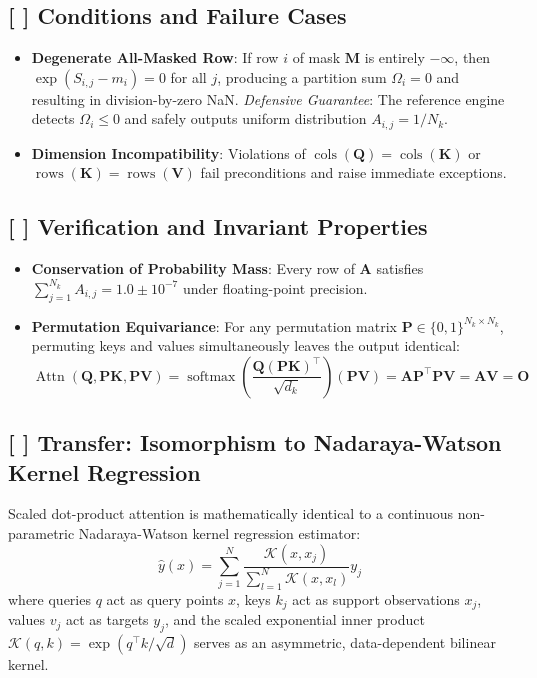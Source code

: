 \documentclass[11pt,a4paper]{article}
\theoremstyle{definition}
\begin{document}
\subsection{[ ] Conditions and Failure Cases}
\begin{itemize}
    \item \textbf{Degenerate All-Masked Row}: If row $i$ of mask $\mathbf{M}$ is entirely $-\infty$, then $\exp(S_{i, j} - m_i) = 0$ for all $j$, producing a partition sum $\Omega_i = 0$ and resulting in division-by-zero NaN. \emph{Defensive Guarantee}: The reference engine detects $\Omega_i \le 0$ and safely outputs uniform distribution $A_{i, j} = 1/N_k$.
    \item \textbf{Dimension Incompatibility}: Violations of $\operatorname{cols}(\mathbf{Q}) = \operatorname{cols}(\mathbf{K})$ or $\operatorname{rows}(\mathbf{K}) = \operatorname{rows}(\mathbf{V})$ fail preconditions and raise immediate exceptions.
\end{itemize}

\subsection{[ ] Verification and Invariant Properties}
\begin{itemize}
    \item \textbf{Conservation of Probability Mass}: Every row of $\mathbf{A}$ satisfies $\sum_{j=1}^{N_k} A_{i, j} = 1.0 \pm 10^{-7}$ under floating-point precision.
    \item \textbf{Permutation Equivariance}: For any permutation matrix $\mathbf{P} \in \{0, 1\}^{N_k \times N_k}$, permuting keys and values simultaneously leaves the output identical:
    {\boldmath
    \begin{equation}
    \operatorname{Attn}(\mathbf{Q}, \mathbf{P}\mathbf{K}, \mathbf{P}\mathbf{V}) = \operatorname{softmax}\left(\frac{\mathbf{Q}(\mathbf{P}\mathbf{K})^\top}{\sqrt{d_k}}\right)(\mathbf{P}\mathbf{V}) = \mathbf{A}\mathbf{P}^\top \mathbf{P}\mathbf{V} = \mathbf{A}\mathbf{V} = \mathbf{O}
    \end{equation}
    }
\end{itemize}

\subsection{[ ] Transfer: Isomorphism to Nadaraya-Watson Kernel Regression}
Scaled dot-product attention is mathematically identical to a continuous non-parametric Nadaraya-Watson kernel regression estimator:
{\boldmath
\begin{equation}
\hat{y}(x) = \sum_{j=1}^N \frac{\mathcal{K}(x, x_j)}{\sum_{l=1}^N \mathcal{K}(x, x_l)} y_j
\end{equation}
}
where queries $q$ act as query points $x$, keys $k_j$ act as support observations $x_j$, values $v_j$ act as targets $y_j$, and the scaled exponential inner product $\mathcal{K}(q, k) = \exp(q^\top k / \sqrt{d})$ serves as an asymmetric, data-dependent bilinear kernel.
\end{document}
